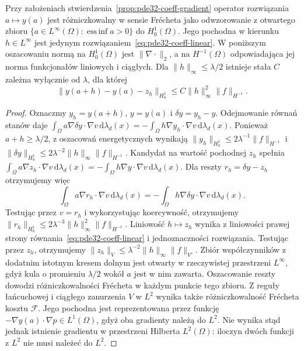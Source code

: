 \begin{wniosek}
\label{cor:pde32-frechet}
Przy założeniach stwierdzenia~\ref{prop:pde32-coeff-gradient}
operator rozwiązania $a\mapsto y(a)$ jest różniczkowalny
w sensie Frécheta jako odwzorowanie z otwartego zbioru
$\{a\in L^\infty(\Omega):\operatorname*{ess\,inf}a>0\}$
do $H_0^1(\Omega)$. Jego pochodna w kierunku $h\in L^\infty$
jest jedynym rozwiązaniem~\eqref{eq:pde32-coeff-linear}.
W poniższym oszacowaniu normą na $H_0^1(\Omega)$
jest $\|\nabla\cdot\|_2$, a na $H^{-1}(\Omega)$
odpowiadająca jej norma funkcjonałów liniowych i ciągłych.
Dla $\|h\|_\infty\le\lambda/2$ istnieje stała $C$
zależna wyłącznie od $\lambda$, dla której
\[
 \|y(a+h)-y(a)-z_h\|_{H_0^1}
 \le C\|h\|_\infty^2\|f\|_{H^{-1}}.
\]
\end{wniosek}
\begin{proof}
Oznaczmy $y_h=y(a+h)$, $y=y(a)$ i $\delta y=y_h-y$.
Odejmowanie równań stanów daje
$\int_\Omega a\nabla\delta y\cdot\nabla v\,\mathrm d\lambda_d(x)
=-\int_\Omega h\nabla y_h\cdot\nabla v\,\mathrm d\lambda_d(x)$.
Ponieważ $a+h\ge\lambda/2$, z oszacowań energetycznych
wynikają $\|y_h\|_{H_0^1}\le2\lambda^{-1}\|f\|_{H^{-1}}$
i $\|\delta y\|_{H_0^1}\le
2\lambda^{-2}\|h\|_\infty\|f\|_{H^{-1}}$.
Kandydat na wartość pochodnej $z_h$ spełnia
$\int_\Omega a\nabla z_h\cdot\nabla v\,\mathrm d\lambda_d(x)
=-\int_\Omega h\nabla y\cdot\nabla v\,\mathrm d\lambda_d(x)$.
Dla reszty $r_h=\delta y-z_h$ otrzymujemy więc
\[
 \int_\Omega a\nabla r_h\cdot\nabla v\,\mathrm d\lambda_d(x)
 =-\int_\Omega h\nabla\delta y\cdot\nabla v\,\mathrm d\lambda_d(x).
\]
Testując przez $v=r_h$ i wykorzystując koercywność,
otrzymujemy $\|r_h\|_{H_0^1}\le
2\lambda^{-3}\|h\|_\infty^2\|f\|_{H^{-1}}$.
Liniowość $h\mapsto z_h$ wynika z liniowości
prawej strony równania~\eqref{eq:pde32-coeff-linear}
i jednoznaczności rozwiązania. Testując przez
$z_h$, otrzymujemy
$\|z_h\|_V\le\lambda^{-2}\|h\|_\infty\|f\|_{V'}$.
Zbiór współczynników z dodatnim istotnym kresem
dolnym jest otwarty w rzeczywistej przestrzeni
$L^\infty$, gdyż kula o promieniu $\lambda/2$
wokół $a$ jest w nim zawarta.
Oszacowanie reszty dowodzi różniczkowalności
Frécheta w każdym punkcie tego zbioru.
Z reguły łańcuchowej i ciągłego zanurzenia $V$
w $L^2$ wynika także różniczkowalność Frécheta
kosztu $\mathcal F$. Jego pochodna jest reprezentowana
przez funkcję $-\nabla y(a)\cdot\nabla p\in L^1(\Omega)$,
gdyż oba gradienty należą do $L^2$.
Nie wynika stąd jednak istnienie gradientu
w przestrzeni Hilberta $L^2(\Omega)$: iloczyn
dwóch funkcji z $L^2$ nie musi należeć do $L^2$.
\end{proof}

